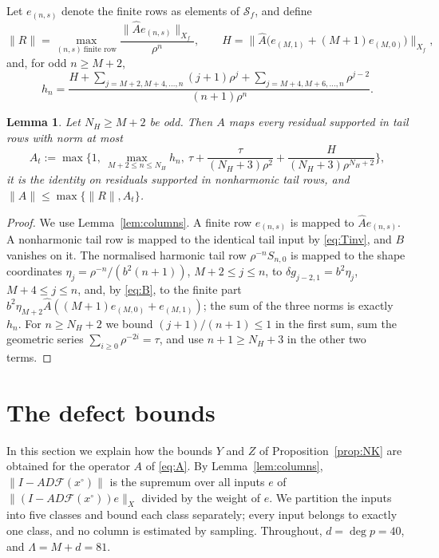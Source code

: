 \documentclass[11pt]{amsart}
\newtheorem{lemma}[theorem]{Lemma}
\theoremstyle{definition}
\theoremstyle{remark}
\numberwithin{equation}{section}
\newcommand{\Sc}{\mathcal{S}}
\newcommand{\Fc}{\mathcal{F}}
\newcommand{\nrm}[1]{\lVert #1\rVert}
\begin{document}
Let $e_{(n,s)}$ denote the finite rows as elements of $\Sc_f$, and define
\[
\nrm R=\max_{(n,s)\ \text{finite row}}\frac{\nrm{\widehat Ae_{(n,s)}}_{X_f}}{\rho^n},\qquad H=\big\|\widehat A\big(e_{(M,1)}+(M+1)e_{(M,0)}\big)\big\|_{X_f},
\]
and, for odd $n\geq M+2$,
\begin{equation}\label{eq:hn}
h_n=\frac{H+\sum_{j=M+2,M+4,\ldots,n}(j+1)\rho^j+\sum_{j=M+4,M+6,\ldots,n}\rho^{j-2}}{(n+1)\rho^n}.
\end{equation}

\begin{lemma}\label{lem:normA}
Let $N_H\geq M+2$ be odd. Then $A$ maps every residual supported in tail rows with norm at most
\[
A_t:=\max\Big\{1,\ \max_{M+2\leq n\leq N_H}h_n,\ \tau+\frac{\tau}{(N_H+3)\rho^2}+\frac{H}{(N_H+3)\rho^{N_H+2}}\Big\},
\]
it is the identity on residuals supported in nonharmonic tail rows, and $\nrm A\leq\max\{\nrm R,A_t\}$.
\end{lemma}

\begin{proof}
We use Lemma~\ref{lem:columns}. A finite row $e_{(n,s)}$ is mapped to $\widehat Ae_{(n,s)}$. A nonharmonic tail row is mapped to the identical tail input by \eqref{eq:Tinv}, and $B$ vanishes on it. The normalised harmonic tail row $\rho^{-n}S_{n,0}$ is mapped to the shape coordinates $\eta_j=\rho^{-n}/(b^2(n+1))$, $M+2\leq j\leq n$, to $\delta g_{j-2,1}=b^2\eta_j$, $M+4\leq j\leq n$, and, by \eqref{eq:B}, to the finite part $b^2\eta_{M+2}\widehat A((M+1)e_{(M,0)}+e_{(M,1)})$; the sum of the three norms is exactly $h_n$. For $n\geq N_H+2$ we bound $(j+1)/(n+1)\leq1$ in the first sum, sum the geometric series $\sum_{i\geq0}\rho^{-2i}=\tau$, and use $n+1\geq N_H+3$ in the other two terms.
\end{proof}

\section{The defect bounds}\label{sec:Z}

In this section we explain how the bounds $Y$ and $Z$ of Proposition~\ref{prop:NK} are obtained for the operator $A$ of \eqref{eq:A}. By Lemma~\ref{lem:columns}, $\nrm{I-AD\Fc(x^\circ)}$ is the supremum over all inputs $e$ of $\nrm{(I-AD\Fc(x^\circ))e}_X$ divided by the weight of $e$. We partition the inputs into five classes and bound each class separately; every input belongs to exactly one class, and no column is estimated by sampling. Throughout, $d=\deg p=40$, and $\Lambda=M+d=81$.
\end{document}
